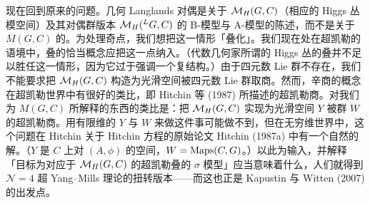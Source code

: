 现在回到原来的问题。几何 Langlands 对偶是关于 $\mathcal{M}_{H}(G,C)$（相应的 Higgs 丛模空间）及其对偶群版本 $\mathcal{M}_{H}({}^{L}G,C)$ 的 B-模型与 A-模型的陈述，而不是关于 $M(G,C)$ 的。为处理奇点，我们想把这一情形「叠化」。我们现在处在超凯勒的语境中，叠的恰当概念应把这一点纳入。（代数几何家所谓的 Higgs 丛的叠并不足以胜任这一情形，因为它过于强调一个复结构。）由于四元数 Lie 群不存在，我们不能要求把 $\mathcal{M}_{H}(G,C)$ 构造为光滑空间被四元数 Lie 群取商。然而，辛商的概念在超凯勒世界中有很好的类比，即 Hitchin 等 (1987) 所描述的超凯勒商。对我们为 $M(G,C)$ 所解释的东西的类比是：把 $\mathcal{M}_{H}(G,C)$ 实现为光滑空间 $Y$ 被群 $W$ 的超凯勒商。用有限维的 $Y$ 与 $W$ 来做这件事可能做不到，但在无穷维世界中，这个问题在 Hitchin 关于 Hitchin 方程的原始论文 Hitchin (1987a) 中有一个自然的解。（$Y$ 是 $C$ 上对 $(A,\phi)$ 的空间，$W=\operatorname{Maps}(C,G)$。）以此为输入，并解释「目标为对应于 $\mathcal{M}_{H}(G,C)$ 的超凯勒叠的 $\sigma$ 模型」应当意味着什么，人们就得到 $\mathcal{N}=4$ 超 Yang--Mills 理论的扭转版本——而这也正是 Kapustin 与 Witten (2007) 的出发点。
